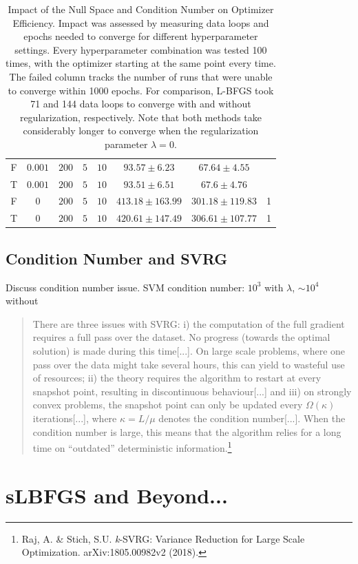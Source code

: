 \documentclass{article}
\begin{document}
\begin{table}[h]
\begin{tabular}{c|c|c|c|c|c|c|c}
F & $ 0.001 $ & $ 200 $ & $ 5 $ & $ 10 $ & $ 93.57 \pm 6.23 $ & $ 67.64 \pm 4.55 $ & \\
T & $ 0.001 $ & $ 200 $ & $ 5 $ & $ 10 $ & $ 93.51 \pm 6.51 $ & $ 67.6 \pm 4.76 $ & \\
F & $ 0 $ & $ 200 $ & $ 5 $ & $ 10 $ & $ 413.18 \pm 163.99 $ & $ 301.18 \pm 119.83 $ & 1 \\
T & $ 0 $ & $ 200 $ & $ 5 $ & $ 10 $ & $ 420.61 \pm 147.49 $ & $ 306.61 \pm 107.77 $ & 1 
\end{tabular}
\caption{Impact of the Null Space and Condition Number on Optimizer Efficiency. Impact was assessed by measuring data loops and epochs needed to converge for different hyperparameter settings. Every hyperparameter combination was tested 100 times, with the optimizer starting at the same point every time. The failed column tracks the number of runs that were unable to converge within 1000 epochs. For comparison, L-BFGS took 71 and 144 data loops to converge with and without regularization, respectively. Note that both methods take considerably longer to converge when the regularization parameter $\lambda=0$.}
\label{table:nullspace}
\end{table}
\subsection{Condition Number and SVRG}
Discuss condition number issue. SVM condition number: $10^3$ with $\lambda$, $\sim 10^4$ without
\begin{quote}
There are three issues with SVRG: i) the computation of the full gradient requires a full pass over the dataset. No progress (towards the optimal solution) is made during this time[...]. On large scale problems, where one pass over the data might take several hours, this can yield to wasteful use of resources; ii) the theory requires the algorithm to restart at every snapshot point, resulting in discontinuous behaviour[...] and iii) on strongly convex problems, the snapshot point can only be updated every $\Omega(\kappa)$ iterations[...], where $\kappa= L/\mu$ denotes the condition number[...]. When the condition number is large, this means that the algorithm relies for a long time on ``outdated'' deterministic information.\footnote{Raj, A. \& Stich, S.U. \emph{k}-SVRG: Variance Reduction for Large Scale Optimization. arXiv:1805.00982v2 (2018).}
\end{quote}

\section{sLBFGS and Beyond...}
\end{document}
